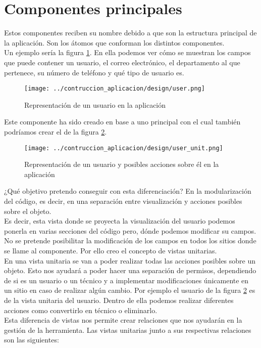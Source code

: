 \section{Componentes principales}
Estos componentes reciben su nombre debido a que son la estructura principal de la aplicación. Son los átomos que conforman los distintos componentes.
\\Un ejemplo sería la figura \ref{fig:user-view}. En ella podemos ver cómo se muestran los campos que puede contener un usuario, el correo electrónico, el departamento al que pertenece, su número de teléfono y qué tipo de usuario es.
\begin{figure}[h]
    \centering
    \texttt{[image: ../contruccion\_aplicacion/design/user.png]}
    \caption{Representación de un usuario en la aplicación}\label{fig:user-view}
\end{figure}
Este componente ha sido creado en base a uno principal con el cual también podríamos crear el de la figura \ref{fig:user-unit}.
\begin{figure}[h]
    \centering
    \texttt{[image: ../contruccion\_aplicacion/design/user\_unit.png]}
    \caption{Representación de un usuario y posibles acciones sobre él en la aplicación}\label{fig:user-unit}
\end{figure}
¿Qué objetivo pretendo conseguir con esta diferenciación? En la modularización del código, es decir, en una separación entre visualización y acciones posibles sobre el objeto.
\\Es decir, esta vista donde se proyecta la visualización del usuario podemos ponerla en varias secciones del código pero, dónde podemos modificar su campos. No se pretende posibilitar la modificación de los campos en todos los sitios donde se llame al componente. Por ello creo el concepto de vistas unitarias.
\\En una vista unitaria se van a poder realizar todas las acciones posibles sobre un objeto. Esto nos ayudará a poder hacer una separación de permisos, dependiendo de si es un usuario o un técnico y a implementar modificaciones únicamente en un sitio en caso de realizar algún cambio. Por ejemplo el usuario de la figura \ref{fig:user-unit} es de la vista unitaria del usuario. Dentro de ella podemos realizar diferentes acciones como convertirlo en técnico o eliminarlo.
\\Esta diferencia de vistas nos permite crear relaciones que nos ayudarán en la gestión de la herramienta. Las vistas unitarias junto a sus respectivas relaciones son las siguientes:

